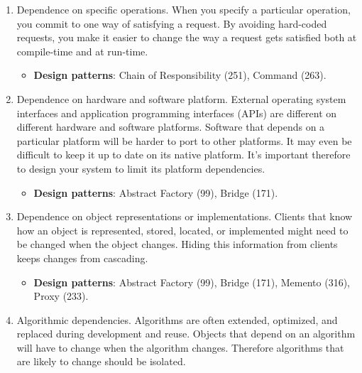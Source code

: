 \documentclass{report}
\begin{document}
\begin{itemize}
\begin{enumerate}
                    \begin{itemize}
                        \item \textbf{Design patterns}: Abstract Factory (99), Factory Method (121), Prototype (133).
                    \end{itemize}
                \item Dependence on specific operations. When you specify a particular operation, you commit to one way of satisfying a request. By avoiding hard-coded requests, you make it easier to change the way a request gets satisfied both at compile-time and at run-time.
                    \begin{itemize}
                        \item \textbf{Design patterns}: Chain of Responsibility (251), Command (263).
                    \end{itemize}
                \item Dependence on hardware and software platform. External operating system interfaces and application programming interfaces (APIs) are different on different hardware and software platforms. Software that depends on a particular platform will be harder to port to other platforms. It may even be difficult to keep it up to date on its native platform. It's important therefore to design your system to limit its platform dependencies.
                    \begin{itemize}
                        \item \textbf{Design patterns}: Abstract Factory (99), Bridge (171).
                    \end{itemize}
                \item Dependence on object representations or implementations. Clients that know how an object is represented, stored, located, or implemented might need to be changed when the object changes. Hiding this information from clients keeps changes from cascading.
                    \begin{itemize}
                        \item \textbf{Design patterns}: Abstract Factory (99), Bridge (171), Memento (316), Proxy (233).
                    \end{itemize}
                \item Algorithmic dependencies. Algorithms are often extended, optimized, and replaced during development and reuse. Objects that depend on an algorithm will have to change when the algorithm changes. Therefore algorithms that are likely to change should be isolated.

\end{enumerate}
\end{itemize}
\end{document}
